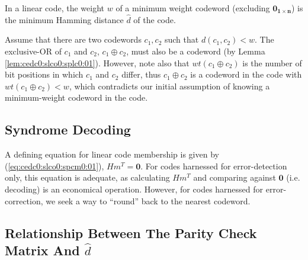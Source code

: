 \begin{vworklemmastatement}
\label{lem:cedc0:slco0:splc0:03}
In a linear code, the weight $w$ of a minimum weight codeword (excluding 
$\mathbf{0_{1 \times n}}$) is the minimum Hamming distance 
$\hat{d}$ of the code.
\end{vworklemmastatement}
\begin{vworklemmaproof}
Assume that there are two codewords $c_1, c_2$ such that
$d(c_1, c_2) < w$.  The exclusive-OR of $c_1$ and $c_2$,
$c_1 \oplus c_2$,
must also be a codeword (by Lemma \ref{lem:cedc0:slco0:splc0:01}).
However, note also that $wt(c_1 \oplus c_2)$ is the number of bit
positions in which $c_1$ and $c_2$ differ, thus 
$c_1 \oplus c_2$ is a codeword in the code with
$wt(c_1 \oplus c_2) < w$, which contradicts our initial assumption of
knowing a minimum-weight codeword in the code.
\end{vworklemmaproof}



\subsection{Syndrome Decoding}
\label{cedc0:slco0:ssdc0}

A defining equation for linear code membership is given by 
(\ref{eq:cedc0:slco0:spcm0:01}), $H m^T = \mathbf{0}$.  For codes harnessed
for error-detection only, this equation is adequate, as calculating 
$H m^T$ and comparing against $\mathbf{0}$ (i.e. decoding) is an economical operation.
However, for codes harnessed for error-correction, we seek a way to ``round'' back to the
nearest codeword.


\subsection[Relationship Between The Parity Check Matrix And \protect\mbox{\protect$\hat{d}$}]
           {Relationship Between The Parity Check Matrix And \protect\mbox{\protect\boldmath$\hat{d}$}}
\label{cedc0:slco0:spcd0}

